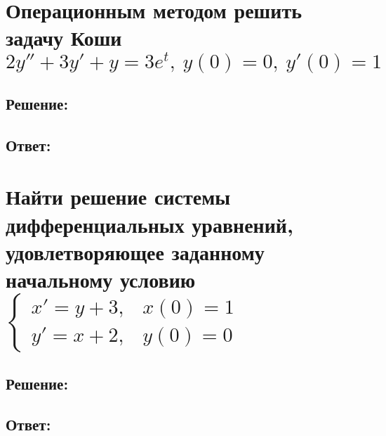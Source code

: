 \documentclass{article}
\begin{document}
	\section{Операционным методом решить задачу Коши $2y'' + 3y' + y = 3e^t, \ y(0) = 0, \ y'(0)=1$}
	\subsection{Решение:}
	\subsection{Ответ:}
	
	\section{Найти решение системы дифференциальных уравнений, удовлетворяющее заданному начальному условию $\begin{cases}
			x'=y+3,& x(0) =1 \\
			y'=x+2,& y(0)=0
		\end{cases}$}
	\subsection{Решение:}
	\subsection{Ответ:}
\end{document}
